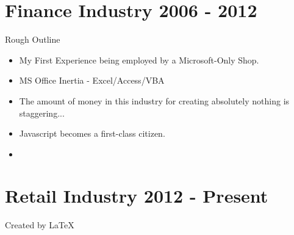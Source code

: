 \documentclass[12pt]{report}
\begin{document}
\section{Finance Industry 2006 - 2012}
Rough Outline
\begin{itemize}
\item My First Experience being employed by a Microsoft-Only Shop.
\item MS Office Inertia - Excel/Access/VBA
\item The amount of money in this industry for creating absolutely
  nothing is staggering...
\item Javascript becomes a first-class citizen.
\item 

\end{itemize}

\section{}
\section{Retail Industry 2012 - Present}


Created by \LaTeX\	
\end{document}
